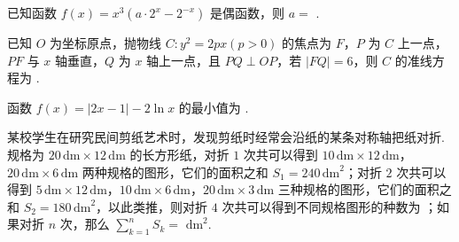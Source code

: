 \documentclass[a4paper,11pt]{report}
\begin{document}
\begin{examquestions}[start=13]

\item 已知函数 $f(x)=x^3(a\cdot2^x-2^{-x})$ 是偶函数，则 $a=$ \blank.

\item 已知 $O$ 为坐标原点，抛物线 $C:y^2=2px(p>0)$ 的焦点为 $F$，$P$ 为 $C$ 上一点，$PF$ 与 $x$ 轴垂直，$Q$ 为 $x$ 轴上一点，且 $PQ\perp OP$，若 $|FQ|=6$，则 $C$ 的准线方程为 \blank.

\item 函数 $f(x)=|2x-1|-2\ln x$ 的最小值为 \blank.

\item 某校学生在研究民间剪纸艺术时，发现剪纸时经常会沿纸的某条对称轴把纸对折. 规格为 $20\,\mathrm{dm}\times12\,\mathrm{dm}$ 的长方形纸，对折 $1$ 次共可以得到 $10\,\mathrm{dm}\times12\,\mathrm{dm}$，$20\,\mathrm{dm}\times6\,\mathrm{dm}$ 两种规格的图形，它们的面积之和 $S_1=240\,\mathrm{dm}^2$；对折 $2$ 次共可以得到 $5\,\mathrm{dm}\times12\,\mathrm{dm}$，$10\,\mathrm{dm}\times6\,\mathrm{dm}$，$20\,\mathrm{dm}\times3\,\mathrm{dm}$ 三种规格的图形，它们的面积之和 $S_2=180\,\mathrm{dm}^2$，以此类推，则对折 $4$ 次共可以得到不同规格图形的种数为 \blank；如果对折 $n$ 次，那么 $\displaystyle\sum_{k=1}^{n}S_k=$ \blank $\mathrm{dm}^2$.

\end{examquestions}
\end{document}
